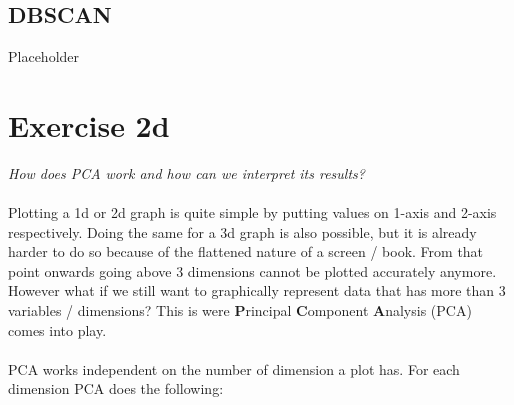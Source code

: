 \documentclass{article}
\begin{document}
\subsection{DBSCAN}
Placeholder


\section{Exercise 2d}
\textit{How does PCA work and how can we interpret its results?}\\
\\
Plotting a 1d or 2d graph is quite simple by putting values on 1-axis and 2-axis respectively. Doing the same for a 3d graph is also possible, but it is already harder to do so because of the flattened nature of a screen / book. From that point onwards going above 3 dimensions cannot be plotted accurately anymore. However what if we still want to graphically represent data that has more than 3 variables / dimensions? This is were \textbf{P}rincipal \textbf{C}omponent \textbf{A}nalysis (PCA) comes into play. \\
\\
PCA works independent on the number of dimension a plot has. For each dimension PCA does the following: 
\end{document}
